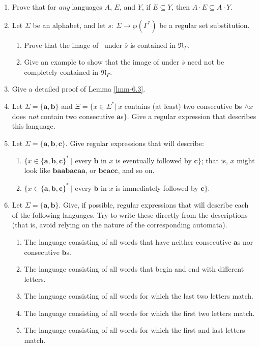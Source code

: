 \begin{enumerate}[{6.}1.]
\item Prove that for \emph{any} languages $A$, $E$, and $Y$, if $E \subseteq Y$,
then $A \cdot E \subseteq A \cdot Y$.

\item Let $\Sigma$ be an alphabet, and let $s:\ \Sigma \rightarrow \wp(\Gamma^*)$
be a regular set substitution.
\begin{enumerate}
\item Prove that the image of \RSIG\ under $\overline{s}$ is contained in $\mathfrak{R}_{\Gamma}$.
\item Give an example to show that the image of \NSIG under $\overline{s}$ need
not be completely contained in $\mathfrak{N}_{\Gamma}$.
\end{enumerate}

\item Give a detailed proof of Lemma \ref{lmm-6.3}.

\item Let $\Sigma=\{\pmb{a},\pmb{b}\}$ and $\Xi=\{x \in \Sigma^*|\ x$ contains (at
least) two consecutive $\pmb{b}$s $\wedge x$ does \emph{not} contain two
consecutive $\pmb{a}$s$\}$. %
Give a regular expression that describes this language.

\item Let $\Sigma = \{\pmb{a},\pmb{b},\pmb{c}\}$. Give regular expressions that will describe:
\begin{enumerate}
\item $\{x \in \{\pmb{a},\pmb{b},\pmb{c}\}^*\ |$ every $\pmb{b}$ in $x$ is eventually
followed by $\pmb{c}\}$; that is, $x$ might look like $\pmb{baabacaa}$, or
$\pmb{bcacc}$, and so on.
\item $\{x \in\{\pmb{a},\pmb{b},\pmb{c}\}^*\ |$ every $\pmb{b}$ in $x$ is immediately
followed by $\pmb{c}\}$.
\end{enumerate}

\item Let $\Sigma=\{\pmb{a},\pmb{b}\}$. Give, if possible, regular expressions
that will describe each of the following languages. Try to write these directly
from the descriptions (that is, avoid relying on the nature of the corresponding
automata).
\begin{enumerate}
\item The language consisting of all words that have neither consecutive
$\pmb{a}$s nor consecutive $\pmb{b}$s.
\item The language consisting of all words that begin and end with different
letters.
\item The language consisting of all words for which the last two letters match.
\item The language consisting of all words for which the first two letters
match.
\item The language consisting of all words for which the first and last letters
match.
\end{enumerate}


\end{enumerate}
